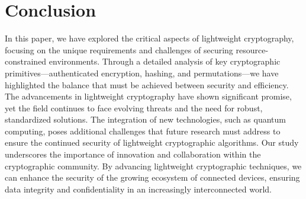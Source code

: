 \section{Conclusion}
In this paper, we have explored the critical aspects of lightweight cryptography, focusing on the unique requirements and challenges of securing resource-constrained environments. Through a detailed analysis of key cryptographic primitives—authenticated encryption, hashing, and permutations—we have highlighted the balance that must be achieved between security and efficiency.
\newline
The advancements in lightweight cryptography have shown significant promise, yet the field continues to face evolving threats and the need for robust, standardized solutions. The integration of new technologies, such as quantum computing, poses additional challenges that future research must address to ensure the continued security of lightweight cryptographic algorithms.
\newline
Our study underscores the importance of innovation and collaboration within the cryptographic community. By advancing lightweight cryptographic techniques, we can enhance the security of the growing ecosystem of connected devices, ensuring data integrity and confidentiality in an increasingly interconnected world.
